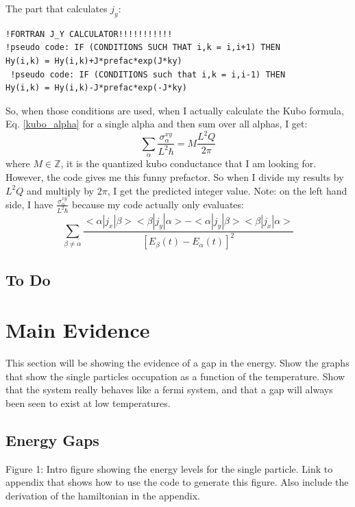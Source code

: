 \documentclass[12pt]{article}
\begin{document}
The part that calculates $j_y$:
\begin{lstlisting}
!FORTRAN J_Y CALCULATOR!!!!!!!!!!!
!pseudo code: IF (CONDITIONS SUCH THAT i,k = i,i+1) THEN
Hy(i,k) = Hy(i,k)+J*prefac*exp(J*ky)
 !pseudo code: IF (CONDITIONS such that i,k = i,i-1) THEN
Hy(i,k) = Hy(i,k)-J*prefac*exp(-J*ky)
\end{lstlisting}


So, when those conditions are used, when I actually calculate the Kubo formula, Eq. \eqref{kubo_alpha} for a single alpha
and then sum over all alphas, I get:
\begin{equation}
\label{result}
\sum_{\alpha} \frac{\sigma^{xy}_\alpha }{L^2 \hbar} = M \frac{L^2Q}{ 2 \pi}
\end{equation}
where $M \in \mathbb{Z}$, it is the quantized kubo conductance that I am looking for. However, the code gives me this funny prefactor. So
when I divide my results by $L^2 Q$ and multiply by $2 \pi$, I get the predicted integer value. Note: on the left hand side, I have
$\frac{\sigma^{xy}_\alpha }{L^2 \hbar} $ because my code actually only evaluates: $$ \sum_{\beta \neq \alpha} \frac{<\alpha|j_x|\beta > <\beta|j_y|\alpha> - <\alpha|j_y|\beta><\beta|j_x|\alpha>}{[E_\beta(t)-E_\alpha(t)]^2}$$

\subsection{To Do}

\section{Main Evidence}
This section will be showing the evidence of a gap in the energy. Show the graphs that
show the single particles occupation as a function of the temperature. Show that the system
really behaves like a fermi system, and that a gap will always been seen to exist at low
temperatures.
\subsection{Energy Gaps}
Figure 1: Intro figure showing the energy levels for the single particle.
Link to appendix that shows how to use the code to generate this figure.
Also include the derivation of the hamiltonian in the appendix.
\end{document}
